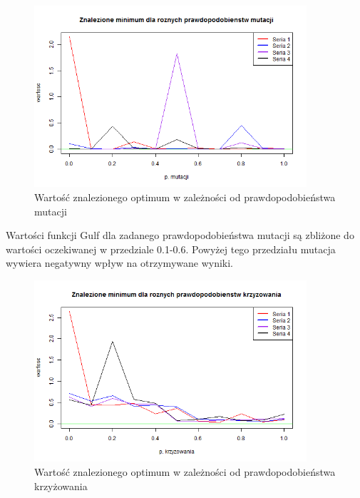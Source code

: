 \documentclass[11pt, a4paper]{article}
\newcommand{\fbi}{\leavevmode{\parindent=1em\indent}}
\begin{document}
\begin{figure}[H]
	\begin{center}
		\includegraphics[width=0.9\textwidth]{./assets/Gulf2.png} %
		\caption{Wartość znalezionego optimum w zależności od prawdopodobieństwa mutacji}
		\label{fig:gulf2}
	\end{center}
\end{figure}

\fbi
Wartości funkcji Gulf dla zadanego prawdopodobieństwa mutacji są zbliżone do wartości oczekiwanej w przedziale 0.1-0.6. Powyżej tego przedziału mutacja wywiera negatywny wpływ na otrzymywane wyniki.


\begin{figure}[H]
	\begin{center}
		\includegraphics[width=0.9\textwidth]{./assets/Gulf3.png} %
		\caption{Wartość znalezionego optimum w zależności od prawdopodobieństwa krzyżowania}
		\label{fig:gulf3}
	\end{center}
\end{figure}
\end{document}
